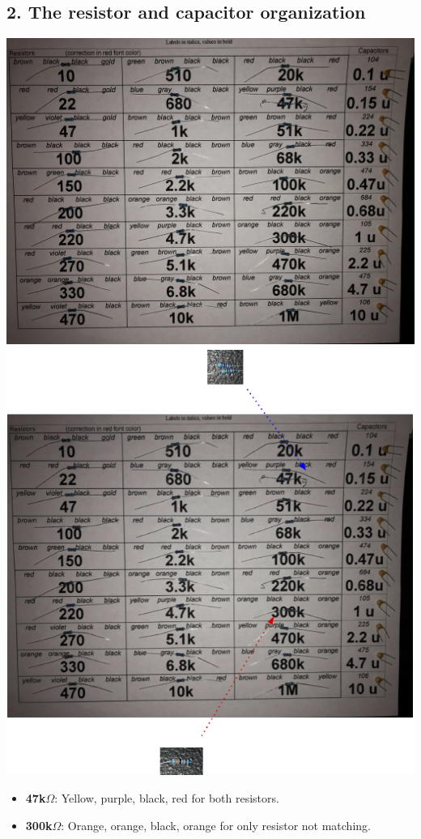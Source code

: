 \documentclass[a4paper]{article}
\begin{document}
\newpage
\begin{center}
  \section*{2. The resistor and capacitor organization}
  \includegraphics[scale=0.08]{2.jpeg}
  \includegraphics[scale=0.4]{2a.jpg}
\end{center}
\begin{itemize}
  \item \textbf{47k\(\Omega \)}: Yellow, purple, black, red for both resistors.
  \item \textbf{300k\(\Omega \)}: Orange, orange, black, orange for only resistor not matching.
\end{itemize}
\end{document}
